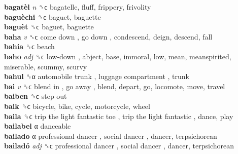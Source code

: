 \textbf{bagatèl} \emph{n}  ␝ϲ  bagatelle, fluff, frippery, frivolity  \\
\textbf{baguèchi} ␝ϲ  baguet, baguette  \\
\textbf{baguèt} ␝ϲ  baguet, baguette  \\
\textbf{baha} \emph{v}  ␝ϲ   come down ,  go down , condescend, deign, descend, fall  \\
\textbf{bahia} ␝ϲ  beach  \\
\textbf{baho} \emph{adj}  ␝ϲ   low-down , abject, base, immoral, low, mean, meanspirited, miserable, scummy, scurvy  \\
\textbf{bahul} ␝α   automobile trunk ,  luggage compartment , trunk  \\
\textbf{bai} \emph{v}  ␝ϲ   blend in ,  go away , blend, depart, go, locomote, move, travel  \\
\textbf{baiben} ␝ϲ   step out   \\
\textbf{baik} ␝ϲ  bicycle, bike, cycle, motorcycle, wheel  \\
\textbf{baila} ␝ϲ   trip the light fantastic toe ,  trip the light fantastic , dance, play  \\
\textbf{bailabel} α  danceable  \\
\textbf{bailado} α   professional dancer ,  social dancer , dancer, terpsichorean  \\
\textbf{bailadó} \emph{adj}  ␝ϲ   professional dancer ,  social dancer , dancer, terpsichorean  \\
